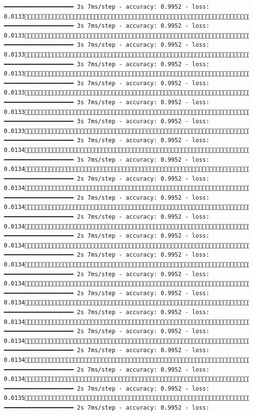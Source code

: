 \documentclass[
  letterpaper,
  DIV=11,
  numbers=noendperiod]{scrreprt}
\begin{document}
\begin{verbatim}
━━━━━━━━━━━━━━━━━━━━ 3s 7ms/step - accuracy: 0.9952 - loss: 0.01331418/1875 ━━━━━━━━━━━━━━━━━━━━ 3s 7ms/step - accuracy: 0.9952 - loss: 0.01331425/1875 ━━━━━━━━━━━━━━━━━━━━ 3s 7ms/step - accuracy: 0.9952 - loss: 0.01331433/1875 ━━━━━━━━━━━━━━━━━━━━ 3s 7ms/step - accuracy: 0.9952 - loss: 0.01331440/1875 ━━━━━━━━━━━━━━━━━━━━ 3s 7ms/step - accuracy: 0.9952 - loss: 0.01331448/1875 ━━━━━━━━━━━━━━━━━━━━ 3s 7ms/step - accuracy: 0.9952 - loss: 0.01331456/1875 ━━━━━━━━━━━━━━━━━━━━ 3s 7ms/step - accuracy: 0.9952 - loss: 0.01331464/1875 ━━━━━━━━━━━━━━━━━━━━ 3s 7ms/step - accuracy: 0.9952 - loss: 0.01341472/1875 ━━━━━━━━━━━━━━━━━━━━ 3s 7ms/step - accuracy: 0.9952 - loss: 0.01341480/1875 ━━━━━━━━━━━━━━━━━━━━ 2s 7ms/step - accuracy: 0.9952 - loss: 0.01341487/1875 ━━━━━━━━━━━━━━━━━━━━ 2s 7ms/step - accuracy: 0.9952 - loss: 0.01341494/1875 ━━━━━━━━━━━━━━━━━━━━ 2s 7ms/step - accuracy: 0.9952 - loss: 0.01341501/1875 ━━━━━━━━━━━━━━━━━━━━ 2s 7ms/step - accuracy: 0.9952 - loss: 0.01341508/1875 ━━━━━━━━━━━━━━━━━━━━ 2s 7ms/step - accuracy: 0.9952 - loss: 0.01341515/1875 ━━━━━━━━━━━━━━━━━━━━ 2s 7ms/step - accuracy: 0.9952 - loss: 0.01341523/1875 ━━━━━━━━━━━━━━━━━━━━ 2s 7ms/step - accuracy: 0.9952 - loss: 0.01341530/1875 ━━━━━━━━━━━━━━━━━━━━ 2s 7ms/step - accuracy: 0.9952 - loss: 0.01341538/1875 ━━━━━━━━━━━━━━━━━━━━ 2s 7ms/step - accuracy: 0.9952 - loss: 0.01341545/1875 ━━━━━━━━━━━━━━━━━━━━ 2s 7ms/step - accuracy: 0.9952 - loss: 0.01341553/1875 ━━━━━━━━━━━━━━━━━━━━ 2s 7ms/step - accuracy: 0.9952 - loss: 0.01341561/1875 ━━━━━━━━━━━━━━━━━━━━ 2s 7ms/step - accuracy: 0.9952 - loss: 0.01351568/1875 ━━━━━━━━━━━━━━━━━━━━ 2s 7ms/step - accuracy: 0.9952 - loss: 
\end{verbatim}
\end{document}
